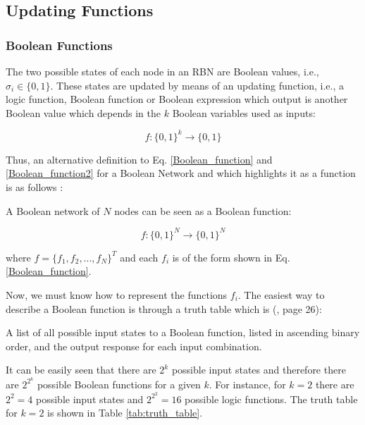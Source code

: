 \subsection{Updating Functions}
\subsubsection{Boolean Functions}
The two possible states of each node in an RBN are Boolean values, i.e., $\sigma_{i} \in \{0,1 \}$. These states are updated by means of an updating function, i.e., a logic function, Boolean function or Boolean expression which output is another Boolean value which depends in the $k$ Boolean variables used as inputs:

\begin{equation}
  f: \{0,1 \}^{k} \rightarrow \{0,1 \}
\end{equation}

Thus, an alternative definition to Eq. \ref{Boolean_function} and \ref{Boolean_function2} for a Boolean Network and which highlights it as a function is as follows \cite{coding_boolean}:\\

\begin{defn}
\label{Alternative_Definition}
	A Boolean network of $N$ nodes can be seen as a Boolean function:

\begin{equation}
  f: \{0,1 \}^{N} \rightarrow \{0,1 \}^{N}
\end{equation}

	where $f= \{ f_{1},f_{2},...,f_{N} \}^{T}$ and each $f_{i}$ is of the form shown in Eq. \ref{Boolean_function}.\\
\end{defn}

Now, we must know how to represent the functions $f_{i}$. The easiest way to describe a Boolean function is through a truth table which is (\cite{digital}, page 26):

\begin{defn}
	A list of all possible input states to a Boolean function, listed in ascending binary order, and the output response for each input combination.
\end{defn}

It can be easily seen that there are $2^{k}$ possible input states and therefore there are $2^{2^{k}}$ possible  Boolean functions for a given $k$. For instance, for $k=2$ there are $2^{2}=4$ possible input states and $2^{2^{2}}=16$ possible logic functions. The truth table for $k=2$ is shown in Table \ref{tab:truth_table}.\\

